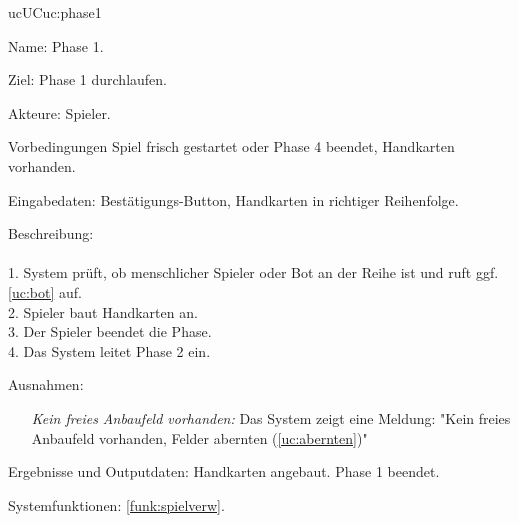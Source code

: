 \begin{description}[leftmargin=5em, style=sameline]
	\begin{lhp}{uc}{UC}{uc:phase1}
		\item [Name:] Phase 1.
		\item [Ziel:] Phase 1 durchlaufen.
		\item [Akteure:] Spieler.
		\item [Vorbedingungen] Spiel frisch gestartet oder Phase 4 beendet, Handkarten vorhanden.
		\item [Eingabedaten:] Bestätigungs-Button, Handkarten in richtiger Reihenfolge.
		\item [Beschreibung:] \hfill\\ \hfill\\
			1. System prüft, ob menschlicher Spieler oder Bot an der Reihe ist und ruft ggf. \ref{uc:bot} auf.\\
			2. Spieler baut Handkarten an.\\
			3. Der Spieler beendet die Phase.\\
			4. Das System leitet Phase 2 ein.\\
		\item [Ausnahmen:] \hfill
			\begin{itemize} 
				\item[] \textit{Kein freies Anbaufeld vorhanden:} Das System zeigt eine Meldung: {}"{}Kein freies Anbaufeld vorhanden, Felder abernten (\ref{uc:abernten}){}"
				
			\end{itemize}
		\item [Ergebnisse und Outputdaten:] Handkarten angebaut. Phase 1 beendet.	
		\item [Systemfunktionen:] \ref{funk:spielverw}.
	\end{lhp}


\end{description}

